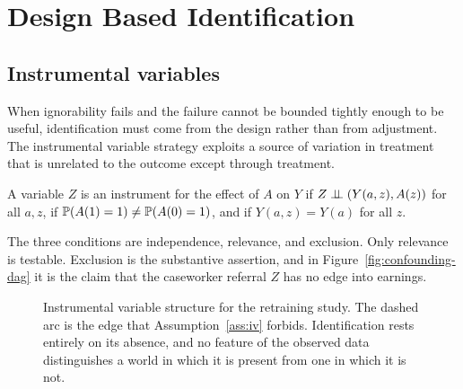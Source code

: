 \chapter{Design Based Identification}
\label{chap:design}

\section{Instrumental variables}
\label{sec:design-iv}

When ignorability fails and the failure cannot be bounded tightly enough to be
useful, identification must come from the design rather than from adjustment.
The instrumental variable strategy exploits a
source of variation in treatment that is unrelated to the outcome except through
treatment.

\begin{assumption}
\label{ass:iv}
A variable $Z$ is an instrument for the effect of $A$ on $Y$ if
$Z \perp\!\!\!\perp \left( Y(a,z), A(z) \right)$ for all $a, z$, if
$\mathbb{P}(A(1) = 1) \neq \mathbb{P}(A(0) = 1)$, and if $Y(a, z) = Y(a)$ for all $z$.
\end{assumption}

The three conditions are independence, relevance, and
exclusion. Only relevance
is testable. Exclusion is the substantive assertion, and in
Figure~\ref{fig:confounding-dag} it is the claim that the caseworker referral
$Z$ has no edge into earnings.

\begin{figure}[t]
\centering
{}
\caption[Instrumental variable structure]{Instrumental variable structure for
the retraining study. The dashed arc is the edge that
Assumption~\ref{ass:iv} forbids. Identification rests entirely on its absence,
and no feature of the observed data distinguishes a world in which it is present
from one in which it is not.}
\label{fig:iv-dag}
\end{figure}

